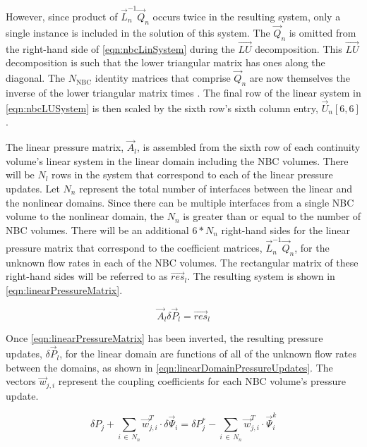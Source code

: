 However, since product of $\vec{L}_{n}^{-1}\vec{Q}_{n}$ occurs twice in the resulting system, only a single instance is included in the solution of this system.
The $\vec{Q}_{n}$ is omitted from the right-hand side of \eqref{eqn:nbcLinSystem} during the $\vec{LU}$ decomposition.
This $\vec{LU}$ decomposition is such that the lower triangular matrix has ones along the diagonal.
The $N_{\text{NBC}}$ identity matrices that comprise $\vec{Q}_{n}$ are now themselves the inverse of the lower triangular matrix times \dt{}.
The final row of the linear system in \eqref{eqn:nbcLUSystem} is then scaled by the sixth row's sixth column entry, $\vec{U}_{n}[6,6]$.

The linear pressure matrix, $\vec{A}_{l}$, is assembled from the sixth row of each continuity volume's linear system in the linear domain including the NBC volumes.
There will be $N_{l}$ rows in the system that correspond to each of the linear pressure updates.
Let $N_{n}$ represent the total number of interfaces between the linear and the nonlinear domains.
Since there can be multiple interfaces from a single NBC volume to the nonlinear domain, the $N_{n}$ is greater than or equal to the number of NBC volumes.
There will be an additional $6 * N_{n}$ right-hand sides for the linear pressure matrix that correspond to the coefficient matrices, $\vec{L}^{-1}_{n}\vec{Q}_{n}$, for the unknown flow rates in each of the NBC volumes.
The rectangular matrix of these right-hand sides will be referred to as $\vec{res}_{l}$.
The resulting system is shown in \eqref{eqn:linearPressureMatrix}.

\begin{equation}
\label{eqn:linearPressureMatrix}
\vec{A}_{l} \delta \vec{P}_{l} = \vec{res}_{l}
\end{equation}

Once \eqref{eqn:linearPressureMatrix} has been inverted, the resulting pressure updates, $\delta \vec{P}_{l}$, for the linear domain are functions of all of the unknown flow rates between the domains, as shown in \eqref{eqn:linearDomainPressureUpdates}.
The vectors $\vec{w}_{j, i}$ represent the coupling coefficients for each NBC volume's pressure update.

\begin{equation}
\label{eqn:linearDomainPressureUpdates}
\delta P_{j} + \sum_{i\, \in \, N_{n}} \vec{w}^{T}_{j, i} \cdot \delta \vec{\Psi}_{i} = \delta P_{j}^{*} - \sum_{i\, \in \, N_{n}} \vec{w}^{T}_{j, i} \cdot{} \vec{\Psi}^{k}_{i}
\end{equation}

